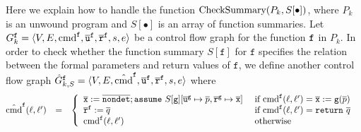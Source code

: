 Here we explain how to handle the function $\textmd{CheckSummary} (P_k, S[\bullet])$, where $P_k$ is an unwound program and $S[\bullet]$ is an
array of function summaries.
Let $G^{\mathtt{{f}}}_k = \langle V, E, \textmd{cmd}^{\mathtt{{f}}}, \overline{\mathtt{u}}^{\mathtt{{f}}}, \overline{\mathtt{r}}^{\mathtt{{f}}},s,e \rangle$ be a
control flow graph for the function $\mathtt{{f}}$ in $P_k$. In order to check whether the function
summary $S[{\mathtt{f}}]$ for $\mathtt{f}$ specifies the relation 
between the formal parameters and return values of $\mathtt{f}$, 
we define another control flow graph
$\hat{G}^{\mathtt{{f}}}_{k,S} = \langle V, E, \hat{\textmd{cmd}}^{\mathtt{{f}}}, \overline{\mathtt{u}}^{\mathtt{{f}}}, \overline{\mathtt{r}}^{\mathtt{{f}}},s,e \rangle$ where
\begin{equation*}
\hspace{-0.2cm}
  \begin{array}{rcl}
    \hat{\textmd{cmd}}^\fun{f} (\ell, \ell') & = &
    \left\{
      \begin{array}{ll}
        \overline{\mathtt{x}} := 
        \overline{\mathtt{nondet}};
        \mathtt{assume\ }S[{\mathtt{g}}][
        \mathtt{\overline{u}^g} \mapsto \overline{p},
        \mathtt{\overline{r}^g} \mapsto \overline{\mathtt{x}}]    
        &
        \textmd{ if } \textmd{cmd}^\fun{f} (\ell, \ell') = 
        \overline{\mathtt{x}} := \mathtt{g} (\overline{p})\\
		\mathtt{\overline{r}}^\fun{f} := \overline{q}
        &
        \textmd{ if } \textmd{cmd}^\fun{f} (\ell, \ell') = \mathtt{return\ }
        \overline{q}\\
        \textmd{cmd}^\fun{f} (\ell, \ell')
        &
		\textmd{ otherwise}        
      \end{array}
    \right.
  \end{array}
\end{equation*}

